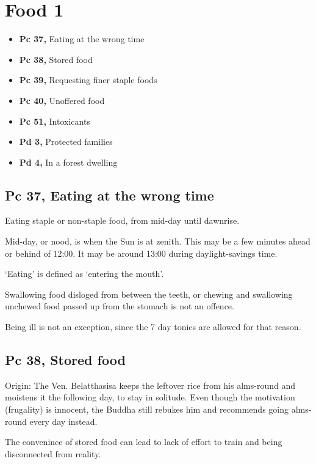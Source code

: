 \chapter{Food 1}

\begin{itemize}
\tightlist
\item
  \textbf{Pc 37,} Eating at the wrong time
\item
  \textbf{Pc 38,} Stored food
\item
  \textbf{Pc 39,} Requesting finer staple foods
\item
  \textbf{Pc 40,} Unoffered food
\item
  \textbf{Pc 51,} Intoxicants
\item
  \textbf{Pd 3,} Protected families
\item
  \textbf{Pd 4,} In a forest dwelling
\end{itemize}


\clearpage

\section{Pc 37, Eating at the wrong time}

Eating staple or non-staple food, from mid-day until dawnrise.

Mid-day, or nood, is when the Sun is at zenith. This may be a few
minutes ahead or behind of 12:00. It may be around 13:00 during
daylight-savings time.

`Eating' is defined as `entering the mouth'.

Swallowing food disloged from between the teeth, or chewing and
swallowing unchewed food passed up from the stomach is not an offence.

Being ill is not an exception, since the 7 day tonics are allowed for
that reason.

\section{Pc 38, Stored food}

Origin: The Ven. Belatthasisa keeps the leftover rice from his
alms-round and moistens it the following day, to stay in solitude. Even
though the motivation (frugality) is innocent, the Buddha still rebukes
him and recommends going alms-round every day instead.

The convenince of stored food can lead to lack of effort to train and
being disconnected from reality.

